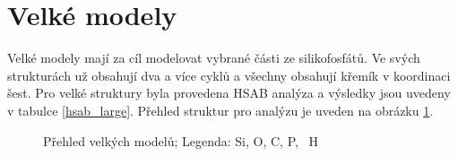 \documentclass[
digital, %
table,   %
lof,     %
lot,     %
oneside,
]{fithesis3}
\begin{document}
\section{Velké modely}
Velké modely mají za cíl modelovat vybrané části ze silikofosfátů. Ve svých strukturách už obsahují dva a více cyklů a všechny obsahují křemík v koordinaci šest. Pro velké struktury byla provedena HSAB analýza a výsledky jsou uvedeny v tabulce \ref{hsab_large}. Přehled struktur pro analýzu je uveden na obrázku \ref{prehled_large}.
\begin{figure}
\begin{center}
\caption{Přehled velkých modelů;  Legenda:  Si,  O,  C,  P, ~H}
\label{prehled_large}
\end{center}
\end{figure}
\end{document}
